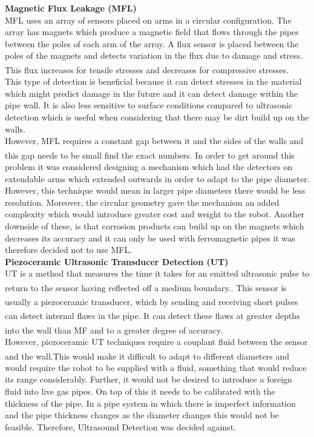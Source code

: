 \documentclass[11pt]{article}		%
\newcommand{\supercite}[1]{\textsuperscript{\cite{#1}}}		%
\begin{document}
	        
	        \textbf{Magnetic Flux Leakage (MFL)}
	        \\
	        MFL uses an array of sensors placed on arms in a circular configuration. The array has magnets which produce a magnetic field that flows through the pipes between the poles of each arm of the array. A flux sensor is placed between the poles of the magnets and detects variation in the flux due to damage and stress. This flux increases for tensile stresses and decreases for compressive stresses.\supercite{MFL_explanation}
	        \\ \hspace*{3ex}
	        This type of detection is beneficial because it can detect stresses in the material which might predict damage in the future and it can detect damage within the pipe wall. It is also less sensitive to surface conditions compared to ultrasonic detection which is useful when considering that there may be dirt build up on the walls.
	        \\ \hspace*{3ex}
	        However, MFL requires a constant gap between it and the sides of the walls and this gap needs to be small find the exact numbers.\supercite{MFL_explanation}  In order to get around this problem it was considered designing a mechanism which had the detectors on extendable arms which extended outwards in order to adapt to the pipe diameter. However, this technique would mean in larger pipe diameters there would be less resolution. Moreover, the circular geometry gave the mechanism an added complexity which would introduce greater cost and weight to the robot. Another downside of these, is that corrosion products can build up on the magnets which decreases its accuracy and it can only be used with ferromagnetic pipes it was therefore decided not to use MFL. 
	        \\
	        \textbf{Piezoceramic Ultrasonic Transducer Detection (UT)}
	        \\
	        UT is a method that measures the time it takes for an emitted ultrasonic pulse to return to the sensor having reflected off a medium boundary.\supercite{UT_explanation}. This sensor is usually a piezoceramic transducer\supercite{UT}, which by sending and receiving short pulses can detect internal flaws in the pipe.\supercite{Corrosion} It can detect these flaws at greater depths into the wall than MF and to a greater degree of accuracy.\supercite{MFL_Pig}
	        \\ \hspace*{3ex}
            However, piezoceramic UT techniques require a couplant fluid between the sensor and the wall.\supercite{UT_explanation}This would make it difficult to adapt to different diameters and would require the robot to be supplied with a fluid, something that would reduce its range considerably. Further, it would not be desired to introduce a foreign fluid into live gas pipes. On top of this it needs to be calibrated with the thickness of the pipe. In a pipe system in which there is imperfect information and the pipe thickness changes as the diameter changes this would not be feasible. Therefore, Ultrasound Detection was decided against. 
\end{document}
